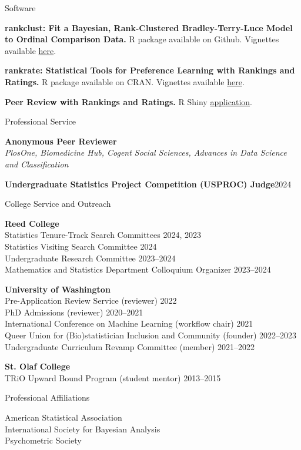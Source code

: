 \documentclass{resume} %
\begin{document}
\begin{rSection}{Software}

\textbf{rankclust: Fit a Bayesian, Rank-Clustered Bradley-Terry-Luce Model to Ordinal Comparison Data.} R package available on Github. Vignettes available \href{https://pearce790.github.io/rankclust/}{here}.

\textbf{rankrate: Statistical Tools for Preference Learning with Rankings and Ratings.} R package available on CRAN. Vignettes available \href{https://pearce790.github.io/rankrate/}{here}.

\textbf{Peer Review with Rankings and Ratings.} R Shiny \href{https://pearce790.shinyapps.io/rankrate_PeerReview/}{application}.

\end{rSection}


\begin{rSection}{Professional Service}

\textbf{Anonymous Peer Reviewer}
\\{\it PlosOne, Biomedicine Hub, Cogent Social Sciences, Advances in Data Science and Classification}

\textbf{Undergraduate Statistics Project Competition (USPROC) Judge}\hfill{2024}

\end{rSection}

\begin{rSection}{College Service and Outreach}

\textbf{Reed College}
\\ Statistics Tenure-Track Search Committees \hfill{2024, 2023}
\\ Statistics Visiting Search Committee \hfill{2024}
\\ Undergraduate Research Committee \hfill{2023--2024}
\\ Mathematics and Statistics Department Colloquium Organizer \hfill{2023--2024}

\textbf{University of Washington}
\\ Pre-Application Review Service (reviewer) \hfill{2022}
\\ PhD Admissions (reviewer) \hfill{2020--2021}
\\ International Conference on Machine Learning (workflow chair) \hfill{2021}
\\ Queer Union for (Bio)statistician Inclusion and Community (founder) \hfill{2022--2023}
\\ Undergraduate Curriculum Revamp Committee (member) \hfill {2021--2022}

\textbf{St. Olaf College}
\\ TRiO Upward Bound Program (student mentor) \hfill {2013--2015}

\end{rSection}

\begin{rSection}{Professional Affiliations}

American Statistical Association
\\ International Society for Bayesian Analysis
\\ Psychometric Society

\end{rSection}
\end{document}
